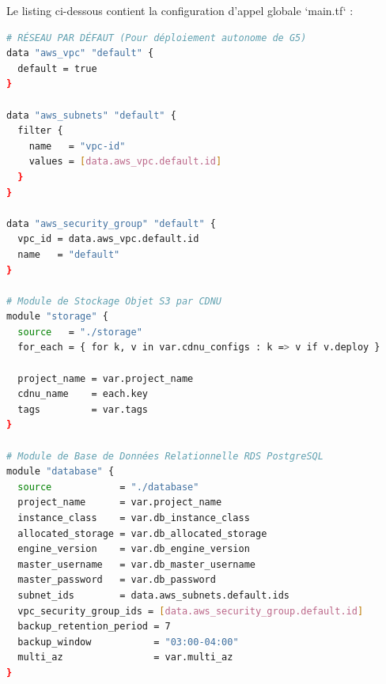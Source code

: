 \documentclass[12pt,a4paper]{article}
\begin{document}
Le listing ci-dessous contient la configuration d'appel globale `main.tf` :
\begin{lstlisting}[language=bash,caption={Configuration principale racine (main.tf) orchestrant les modules}]
# RÉSEAU PAR DÉFAUT (Pour déploiement autonome de G5)
data "aws_vpc" "default" {
  default = true
}

data "aws_subnets" "default" {
  filter {
    name   = "vpc-id"
    values = [data.aws_vpc.default.id]
  }
}

data "aws_security_group" "default" {
  vpc_id = data.aws_vpc.default.id
  name   = "default"
}

# Module de Stockage Objet S3 par CDNU
module "storage" {
  source   = "./storage"
  for_each = { for k, v in var.cdnu_configs : k => v if v.deploy }

  project_name = var.project_name
  cdnu_name    = each.key
  tags         = var.tags
}

# Module de Base de Données Relationnelle RDS PostgreSQL
module "database" {
  source            = "./database"
  project_name      = var.project_name
  instance_class    = var.db_instance_class
  allocated_storage = var.db_allocated_storage
  engine_version    = var.db_engine_version
  master_username   = var.db_master_username
  master_password   = var.db_password
  subnet_ids        = data.aws_subnets.default.ids
  vpc_security_group_ids = [data.aws_security_group.default.id]
  backup_retention_period = 7
  backup_window           = "03:00-04:00"
  multi_az                = var.multi_az
}
\end{lstlisting}
\end{document}
